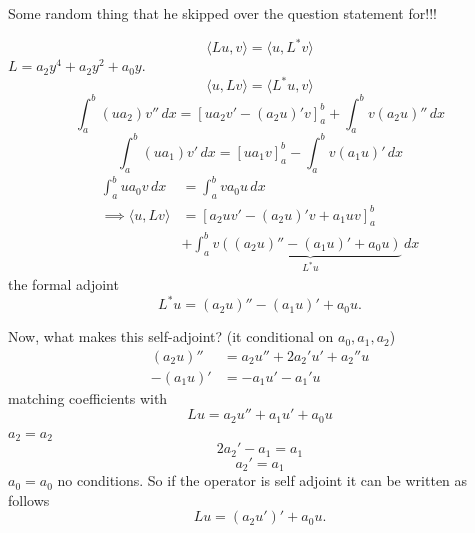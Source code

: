 \documentclass[10pt, a4paper]{article}
\begin{document}
\begin{problem}\phantom{}
    Some random thing that he skipped over the question statement for!!!

    \begin{solution}
        \[
        \langle Lu, v\rangle = \langle u, L ^ {*}v\rangle
        \]
        $L = a_2y ^ 4 + a_2y ^ 2 + a_0y$.
        \[
        \langle u, Lv\rangle = \langle L ^ {*}u, v\rangle
        \]
        \[
        \int_{a}^{b}(ua_2)v''\,dx = \left[ua_2v' - (a_2u)'v\right]_{a}^{b} + \int_{a}^{b}v(a_2u)''\,dx
        \]
        \[
        \int_{a}^{b}(ua_1)v'\,dx = \left[ua_1v\right]_{a}^{b} - \int_{a}^{b}v(a_1u)'\,dx
        \]
        \begin{align*}
            \int_{a}^{b}ua_0v\,dx &= \int_{a}^{b}va_0u\,dx \\
            \implies \langle u, Lv\rangle &= \left[a_2uv' - (a_2u)'v + a_1uv\right]_{a}^{b} \\
            &+ \int_{a}^{b}v\underbrace{((a_2u)'' - (a_1u)' + a_0u)}_{L ^ {*}u}\,dx
        \end{align*}
        the formal adjoint
        \[
        L ^ {*}u = (a_2u)'' - (a_1u)' + a_0u.
        \]

        Now,
        what makes this self-adjoint?
        (it conditional on $a_0, a_1, a_2$)
        \begin{align*}
            (a_2u)'' &= a_2u'' + 2a_2'u' + a_2''u \\
            -(a_1u)' &= -a_1u' - a_1'u
        \end{align*}
        matching coefficients with
        \[
        Lu = a_2u'' + a_1u' + a_0u
        \]
        $a_2 = a_2$
        \[
        2a_2' - a_1 = a_1
        \]
        \[
        a_2' = a_1
        \]
        $a_0 = a_0$ no conditions.
        So if the operator is self adjoint it can be written as follows
        \[
        Lu = (a_2u')' + a_0u.
        \]


\end{solution}
\end{problem}
\end{document}
